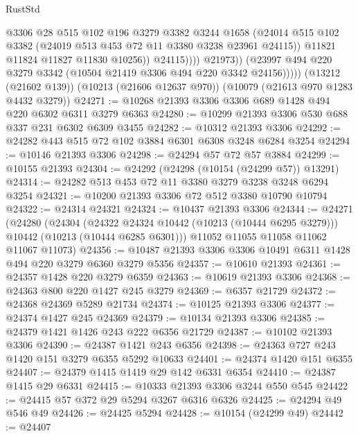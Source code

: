 \begin{lexlean}{RustStd}
\begin{coremodule}
                          @3306
                          @28
                          @515
                          @102
                          @196
                          @3279
                          @3382
                          @3244
                          @1658
                          (@24014
                            @515
                            @102
                            @3382
                            (@24019 @513 @453 @72 @11 @3380 @3238 @23961 @24115))
                          @11821
                          @11824
                          @11827
                          @11830
                          @10256))
                      @24115))))
              @21973))
          (@23997 @494 @220 @3279 @3342 (@10504 @21419 @3306 @494 @220 @3342 @24156)))))
    (@13212 (@21602 @139))
    (@10213 (@21606 @12637 @970))
    (@10079 (@21613 @970 @1283 @4432 @3279))
@24271 := @10268 @21393 @3306 @3306 @689 @1428 @494 @220 @6302 @6311 @3279 @6363
@24280 := @10299 @21393 @3306 @530 @688 @337 @231 @6302 @6309 @3455
@24282 := @10312 @21393 @3306
@24292 := @24282 @443 @515 @72 @102 @3884 @6301 @6308 @3248 @6284 @3254
@24294 := @10146 @21393 @3306
@24298 := @24294 @57 @72 @57 @3884
@24299 := @10155 @21393
@24304 := @24292 (@24298 (@10154 (@24299 @57)) @13291)
@24314 := @24282 @513 @453 @72 @11 @3380 @3279 @3238 @3248 @6294 @3254
@24321 := @10200 @21393 @3306 @72 @512 @3380 @10790 @10794
@24322 := @24314 @24321
@24324 := @10437 @21393 @3306
@24344 := @24271
    (@24280
      (@24304
        (@24322 @24324 @10442 (@10213 (@10444 @6295 @3279)))
        @10442
        (@10213 (@10444 @6285 @6301)))
      @11052
      @11055
      @11058
      @11062
      @11067
      @11073)
@24356 := @10487 @21393 @3306 @3306 @10491 @6311 @1428 @494 @220 @3279 @6360 @3279 @5356
@24357 := @10610 @21393
@24361 := @24357 @1428 @220 @3279 @6359
@24363 := @10619 @21393 @3306
@24368 := @24363 @800 @220 @1427 @245 @3279
@24369 := @6357 @21729
@24372 := @24368 @24369 @5289 @21734
@24374 := @10125 @21393 @3306
@24377 := @24374 @1427 @245 @24369
@24379 := @10134 @21393 @3306
@24385 := @24379 @1421 @1426 @243 @222 @6356 @21729
@24387 := @10102 @21393 @3306
@24390 := @24387 @1421 @243 @6356
@24398 := @24363 @727 @243 @1420 @151 @3279 @6355 @5292 @10633
@24401 := @24374 @1420 @151 @6355
@24407 := @24379 @1415 @1419 @29 @142 @6331 @6354
@24410 := @24387 @1415 @29 @6331
@24415 := @10333 @21393 @3306 @3244 @550 @545
@24422 := @24415 @57 @372 @29 @5294 @3267 @6316 @6326
@24425 := @24294 @49 @546 @49
@24426 := @24425 @5294
@24428 := @10154 (@24299 @49)
@24442 := @24407

\end{coremodule}
\end{lexlean}
